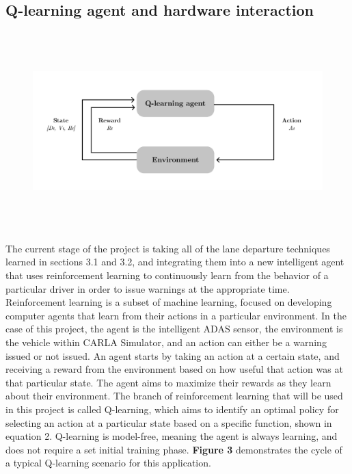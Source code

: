 \documentclass[12pt]{article}
\renewcommand{\_}{\kern-1.5pt\textunderscore\kern-1.5pt}
\begin{document}
\subsection{Q-learning agent and hardware interaction}


\begin{figure}[H]
\centering
\advance\leftskip 0.0in		\includegraphics[width=7in,height=3in]{./media/RL Diagram.png}
\par
\end{figure}



The current stage of the project is taking all of the lane departure techniques learned in sections 3.1 and 3.2, and integrating them into a new intelligent agent that uses reinforcement learning to continuously learn from the behavior of a particular driver in order to issue warnings at the appropriate time. Reinforcement learning is a subset of machine learning, focused on developing computer agents that learn from their actions in a particular environment. In the case of this project, the agent is the intelligent ADAS sensor, the environment is the vehicle within CARLA Simulator, and an action can either be a warning issued or not issued. An agent starts by taking an action at a certain state, and receiving a reward from the environment based on how useful that action was at that particular state. The agent aims to maximize their rewards as they learn about their environment. The branch of reinforcement learning that will be used in this project is called Q-learning, which aims to identify an optimal policy for selecting an action at a particular state based on a specific function, shown in equation 2. Q-learning is model-free, meaning the agent is always learning, and does not require a set initial training phase. \textbf{Figure 3} demonstrates the cycle of a typical Q-learning scenario for this application. \par
\end{document}
